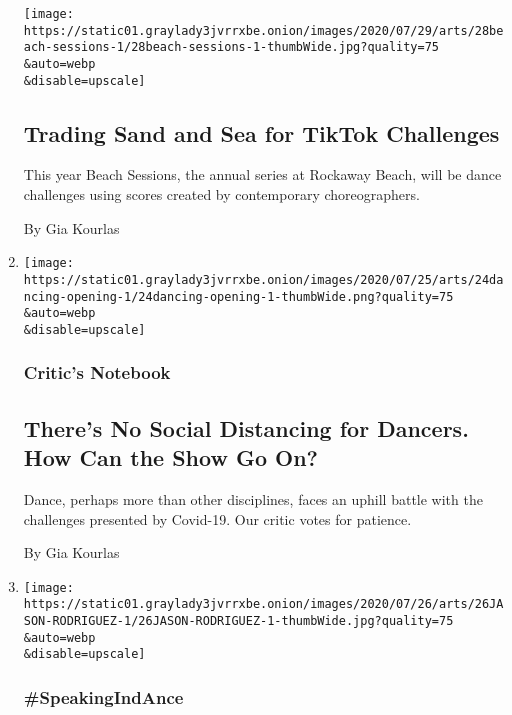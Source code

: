 \begin{enumerate}
  \texttt{[image: https://static01.graylady3jvrrxbe.onion/images/2020/07/29/arts/28beach-sessions-1/28beach-sessions-1-thumbWide.jpg?quality=75\\\&auto=webp\\\&disable=upscale]}

  \hypertarget{trading-sand-and-sea-for-tiktok-challenges}{%
  \subsection{Trading Sand and Sea for TikTok
  Challenges}\label{trading-sand-and-sea-for-tiktok-challenges}}

  This year Beach Sessions, the annual series at Rockaway Beach, will be
  dance challenges using scores created by contemporary choreographers.

  By Gia Kourlas
\item
  \href{/2020/07/24/arts/dance/safety-protocols-dance-coronavirus.html}{}

  \texttt{[image: https://static01.graylady3jvrrxbe.onion/images/2020/07/25/arts/24dancing-opening-1/24dancing-opening-1-thumbWide.png?quality=75\\\&auto=webp\\\&disable=upscale]}

  \hypertarget{critics-notebook-1}{%
  \subsubsection{Critic's Notebook}\label{critics-notebook-1}}

  \hypertarget{theres-no-social-distancing-for-dancers-how-can-the-show-go-on}{%
  \subsection{There's No Social Distancing for Dancers. How Can the Show
  Go
  On?}\label{theres-no-social-distancing-for-dancers-how-can-the-show-go-on}}

  Dance, perhaps more than other disciplines, faces an uphill battle
  with the challenges presented by Covid-19. Our critic votes for
  patience.

  By Gia Kourlas
\item
  \href{/2020/07/24/arts/dance/jason-rodriguez-vogue-pose.html}{}

  \texttt{[image: https://static01.graylady3jvrrxbe.onion/images/2020/07/26/arts/26JASON-RODRIGUEZ-1/26JASON-RODRIGUEZ-1-thumbWide.jpg?quality=75\\\&auto=webp\\\&disable=upscale]}

  \hypertarget{speakingindance}{%
  \subsubsection{\#SpeakingIndAnce}\label{speakingindance}}


\end{enumerate}
